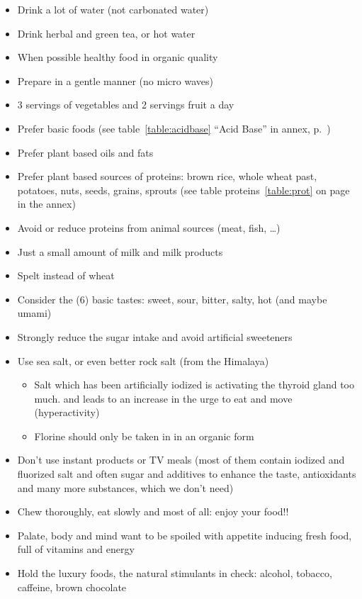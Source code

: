 \documentclass[../main.tex]{subfiles}
\begin{document}
\begin{itemize}
\item Drink a lot of water (not carbonated water)
\item Drink herbal and green tea, or hot water
\item When possible healthy food in organic quality
\item Prepare in a gentle manner (no micro waves)
\item 3 servings of vegetables and 2 servings fruit a day
\item Prefer basic foods (see table~\ref{table:acidbase} ``Acid Base'' in annex, p.~\pageref{table:acidbase})
\item Prefer plant based oils and fats
\item Prefer plant based sources of proteins: brown rice, whole wheat past, potatoes, nuts, seeds, grains, sprouts (see table proteins~\ref{table:prot} on page~\pageref{table:prot} in the annex)
\item Avoid or reduce proteins from animal sources (meat, fish, \ldots)
\item Just a small amount of milk and milk products
\item Spelt instead of wheat
\item Consider the  (6) basic tastes: sweet, sour, bitter, salty, hot (and maybe umami)
\item Strongly reduce the sugar intake and avoid artificial sweeteners
\item Use sea salt, or even better rock salt (from the Himalaya)
  \begin{itemize}
  \item Salt which has been artificially iodized is activating the thyroid gland too much. and leads to an increase in the urge to eat and move (hyperactivity)
  \item Florine should only be taken in in an organic form
  \end{itemize}
\item Don't use instant products or TV meals (most of them contain iodized and fluorized salt and often sugar and additives to enhance the taste, antioxidants and many more substances, which we don't need)
\item Chew thoroughly, eat slowly and most of all: enjoy your food!!
\item Palate, body and mind want to be spoiled with appetite inducing fresh food, full of vitamins and energy
  \item Hold the luxury foods, the natural stimulants in check: alcohol, tobacco, caffeine, brown chocolate
\end{itemize}
\end{document}

